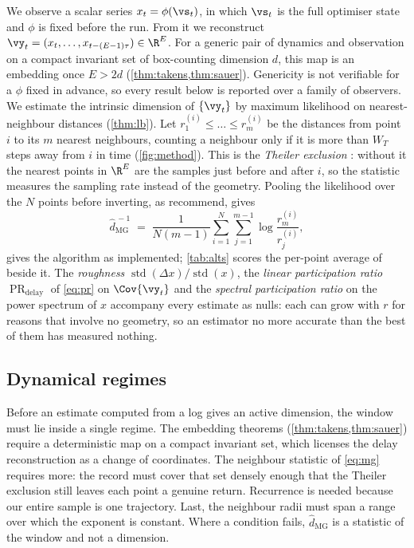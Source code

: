 \documentclass[twoside]{article}
\DeclareMathOperator{\PR}{PR}
\begin{document}
We observe a scalar series $x_t = \phi(\vs_t)$, in which $\vs_t$ is the full optimiser state and
$\phi$ is fixed before the run. From it we reconstruct
$\vy_t = (x_t, \dots, x_{t-(E-1)\tau}) \in \R^E$. For a
generic pair of dynamics and observation on a compact invariant set of box-counting dimension $d$,
this map is an embedding once $E > 2d$ (\cref{thm:takens,thm:sauer}). Genericity is not verifiable
for a $\phi$ fixed in advance, so every result below is reported over a family of observers. We
estimate the intrinsic dimension of $\{\vy_t\}$ by maximum likelihood on nearest-neighbour
distances (\cref{thm:lb}). Let
$r^{(i)}_1 \le \dots \le r^{(i)}_m$ be the distances from point $i$ to its $m$ nearest neighbours,
counting a neighbour only if it is more than $W_T$ steps away from $i$ in time
(\cref{fig:method}). This is the \emph{Theiler exclusion} \citep{theiler1986spurious,
kantz2004nonlinear}: without it the nearest points in $\R^E$ are the samples just before and after
$i$, so the statistic measures the sampling rate instead of the geometry. Pooling the likelihood over the $N$ points before inverting, as
\citet{mackay2005comments} recommend, gives
\begin{equation}\label{eq:mg}
  \hat{d}_{\mathrm{MG}}^{\,-1} \;=\; \frac{1}{N(m-1)} \sum_{i=1}^{N} \sum_{j=1}^{m-1}
  \log \frac{r^{(i)}_m}{r^{(i)}_j} ,
\end{equation}
 gives the algorithm as implemented; \cref{tab:alts} scores the per-point average of
\citet{levina2004maximum} beside it.
The \emph{roughness} $\operatorname{std}(\Delta x)/\operatorname{std}(x)$, the \emph{linear
participation ratio} $\PR_{\mathrm{delay}}$ of \cref{eq:pr} on $\Cov\{\vy_t\}$ and the
\emph{spectral participation ratio} on the power spectrum of $x$ accompany every estimate as
nulls: each can grow with $r$ for reasons that involve no geometry, so an estimator no more
accurate than the best of them has measured nothing.

\subsection{Dynamical regimes}\label{sec:classes}

Before an estimate computed from a log gives an active dimension, the window must lie inside a
single regime. The embedding theorems
(\cref{thm:takens,thm:sauer}) require a deterministic map on a compact invariant set, which
licenses the delay reconstruction as a change of coordinates. The neighbour statistic of
\cref{eq:mg} requires more: the record must cover that set densely enough that the Theiler
exclusion still leaves each point a genuine return. Recurrence is needed because our entire
sample is one trajectory. Last, the
neighbour radii must span a range over which the exponent is constant. Where a condition fails,
$\hat{d}_{\mathrm{MG}}$ is a statistic of the window and not a dimension.
\end{document}
